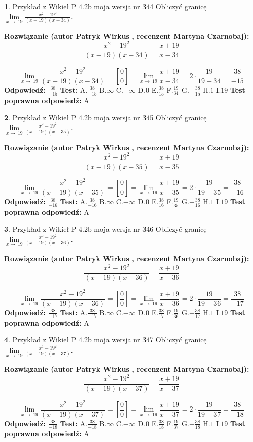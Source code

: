\documentclass[12pt, a4paper]{article}
\theoremstyle{definition} %
\newtheorem{zad}{}
\newcommand{\zadStart}[1]{\begin{zad}#1\newline}
\newcommand{\zadStop}{\end{zad}}
\newcommand{\rozwStart}[2]{\noindent \textbf{Rozwiązanie (autor #1 , recenzent #2): }\newline}
\newcommand{\rozwStop}{\newline}
\newcommand{\odpStart}{\noindent \textbf{Odpowiedź:}\newline}
\newcommand{\odpStop}{\newline}
\newcommand{\testStart}{\noindent \textbf{Test:}\newline}
\newcommand{\testStop}{\newline}
\newcommand{\kluczStart}{\noindent \textbf{Test poprawna odpowiedź:}\newline}
\newcommand{\kluczStop}{\newline}
\begin{document}
\zadStart{Przykład z Wikieł P 4.2b moja wersja nr 344}
Obliczyć granicę $\lim\limits_{x\to\ 19}\frac{x^{2}-19^{2}}{(x-19)(x-34)}$.
\zadStop
\rozwStart{Patryk Wirkus}{Martyna Czarnobaj}
$$\frac{x^{2}-19^{2}}{(x-19)(x-34)}=\frac{x+19}{x-34}$$

$$\lim\limits_{x\to\ 19}\frac{x^{2}-19^{2}}{(x-19)(x-34)}=[\frac{0}{0}]=\lim\limits_{x\to\ 19}\frac{x+19}{x-34}=2 \cdot \frac{19}{19-34} = \frac{38}{-15}$$
\rozwStop
\odpStart
$\frac{38}{-15}$
\odpStop
\testStart
A.$\frac{38}{-15}$
B.$\infty$
C.$-\infty$
D.$0$
E.$\frac{38}{15}$
F.$\frac{19}{34}$
G.$-\frac{38}{15}$
H.$1$
I.$19$
\testStop
\kluczStart
A
\kluczStop



\zadStart{Przykład z Wikieł P 4.2b moja wersja nr 345}
Obliczyć granicę $\lim\limits_{x\to\ 19}\frac{x^{2}-19^{2}}{(x-19)(x-35)}$.
\zadStop
\rozwStart{Patryk Wirkus}{Martyna Czarnobaj}
$$\frac{x^{2}-19^{2}}{(x-19)(x-35)}=\frac{x+19}{x-35}$$

$$\lim\limits_{x\to\ 19}\frac{x^{2}-19^{2}}{(x-19)(x-35)}=[\frac{0}{0}]=\lim\limits_{x\to\ 19}\frac{x+19}{x-35}=2 \cdot \frac{19}{19-35} = \frac{38}{-16}$$
\rozwStop
\odpStart
$\frac{38}{-16}$
\odpStop
\testStart
A.$\frac{38}{-16}$
B.$\infty$
C.$-\infty$
D.$0$
E.$\frac{38}{16}$
F.$\frac{19}{35}$
G.$-\frac{38}{16}$
H.$1$
I.$19$
\testStop
\kluczStart
A
\kluczStop



\zadStart{Przykład z Wikieł P 4.2b moja wersja nr 346}
Obliczyć granicę $\lim\limits_{x\to\ 19}\frac{x^{2}-19^{2}}{(x-19)(x-36)}$.
\zadStop
\rozwStart{Patryk Wirkus}{Martyna Czarnobaj}
$$\frac{x^{2}-19^{2}}{(x-19)(x-36)}=\frac{x+19}{x-36}$$

$$\lim\limits_{x\to\ 19}\frac{x^{2}-19^{2}}{(x-19)(x-36)}=[\frac{0}{0}]=\lim\limits_{x\to\ 19}\frac{x+19}{x-36}=2 \cdot \frac{19}{19-36} = \frac{38}{-17}$$
\rozwStop
\odpStart
$\frac{38}{-17}$
\odpStop
\testStart
A.$\frac{38}{-17}$
B.$\infty$
C.$-\infty$
D.$0$
E.$\frac{38}{17}$
F.$\frac{19}{36}$
G.$-\frac{38}{17}$
H.$1$
I.$19$
\testStop
\kluczStart
A
\kluczStop



\zadStart{Przykład z Wikieł P 4.2b moja wersja nr 347}
Obliczyć granicę $\lim\limits_{x\to\ 19}\frac{x^{2}-19^{2}}{(x-19)(x-37)}$.
\zadStop
\rozwStart{Patryk Wirkus}{Martyna Czarnobaj}
$$\frac{x^{2}-19^{2}}{(x-19)(x-37)}=\frac{x+19}{x-37}$$

$$\lim\limits_{x\to\ 19}\frac{x^{2}-19^{2}}{(x-19)(x-37)}=[\frac{0}{0}]=\lim\limits_{x\to\ 19}\frac{x+19}{x-37}=2 \cdot \frac{19}{19-37} = \frac{38}{-18}$$
\rozwStop
\odpStart
$\frac{38}{-18}$
\odpStop
\testStart
A.$\frac{38}{-18}$
B.$\infty$
C.$-\infty$
D.$0$
E.$\frac{38}{18}$
F.$\frac{19}{37}$
G.$-\frac{38}{18}$
H.$1$
I.$19$
\testStop
\kluczStart
A
\kluczStop
\end{document}
